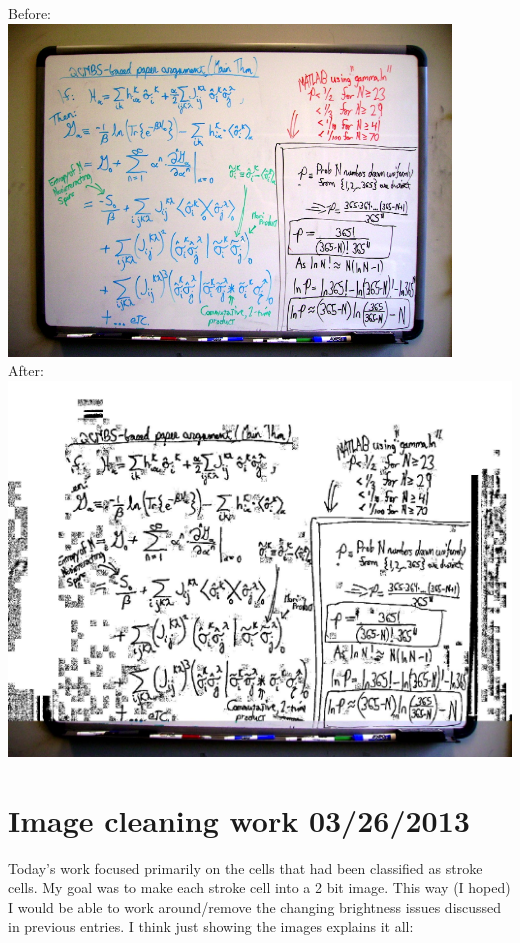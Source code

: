 \documentclass[]{article}
\begin{document}
	Before: \\
	\includegraphics[scale=0.75]{images/origMisBord} \\
	
	After: \\
	\includegraphics[scale=0.90]{images/bordWMisses} \\
	
	
	\section{Image cleaning work 03/26/2013}
	
	Today's work focused primarily on the cells that had been classified as stroke cells. My goal was to make each stroke cell into a 2 bit image. This way (I hoped) I would be able to work around/remove the changing brightness issues discussed in previous entries.
	I think just showing the images explains it all:
	
\end{document}

